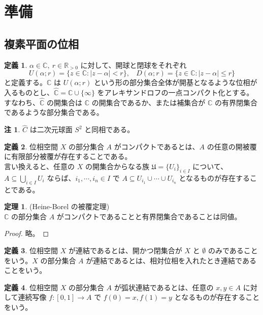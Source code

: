\documentclass{jsarticle}
\theoremstyle{definition}
\newtheorem*{definition*}{定義}
\newtheorem{theorem}{定理}[section]
\newtheorem{remark}{注}[section]
\begin{document}
  \section{準備}
    \subsection{複素平面の位相}
    \begin{definition*} $\alpha \in \mathbb{C}, \ r \in \mathbb{R}_{>0}$ に対して、開球と閉球をそれぞれ
    $$U(\alpha; r) = \{z \in \mathbb{C} : |z - \alpha| < r\}, \ \ \ \ D(\alpha; r) = \{z \in \mathbb{C} : |z - \alpha| \leq r\}$$
    と定義する。$\mathbb{C}$ は $U(\alpha; r)$ という形の部分集合全体が開基となるような位相が入るものとし、$\widehat{\mathbb{C}} = \mathbb{C} \cup \{\infty\}$ をアレキサンドロフの一点コンパクト化とする。すなわち、$\widehat{\mathbb{C}}$ の開集合は $\mathbb{C}$ の開集合であるか、または補集合が $\mathbb{C}$ の有界閉集合であるような部分集合である。
    \end{definition*}
  
    \begin{remark}
      $\widehat{C}$ は二次元球面 $S^2$ と同相である。
    \end{remark}
    \vspace{1ex}
  
    \begin{definition*} 位相空間 $X$ の部分集合 $A$ がコンパクトであるとは、$A$ の任意の開被覆に有限部分被覆が存在することである。\\
    言い換えると、任意の $X$ の開集合からなる族 $\mathfrak{U} = \{U_i\}_{i \in I}$ について、$\displaystyle A \subseteq \bigcup_{i \in I} U_i$ ならば、$i_1, \cdots, i_n \in I$ で $\displaystyle A \subseteq U_{i_1} \cup \cdots \cup U_{i_n}$ となるものが存在することである。
    \end{definition*}
    \begin{theorem} \label{Heine_Borel} (Heine-Borel の被覆定理) \\
        $\mathbb{C}$ の部分集合 $A$ がコンパクトであることと有界閉集合であることは同値。
    \end{theorem}
    \begin{proof}
        略。
    \end{proof}
    \vspace{1ex}
  
    \begin{definition*} \label{connected} 位相空間 $X$ が連結であるとは、開かつ閉集合が $X$ と $\emptyset$ のみであることをいう。$X$ の部分集合 $A$ が連結であるとは、相対位相を入れたとき連結であることをいう。
    \end{definition*}
    \begin{definition*} \label{path_connected} 位相空間 $X$ の部分集合 $A$ が弧状連結であるとは、任意の $x, y \in A$ に対して連続写像 $f : [0, 1] \rightarrow A$ で $f(0) = x, f(1) = y$ となるものが存在することをいう。
    \end{definition*}
    \vspace{1ex}
  
\end{document}
